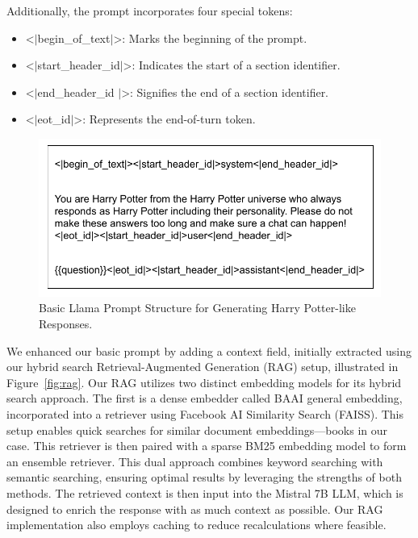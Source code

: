 \documentclass[fleqn,moreauthors,10pt]{ds_report}
\begin{document}
    Additionally, the prompt incorporates four special tokens:

    \begin{itemize}
        \item \textless$\vert$begin\_of\_text$\vert$\textgreater: Marks the beginning of the prompt.
        \item \textless$\vert$start\_header\_id$\vert$\textgreater: Indicates the start of a section identifier.
        \item \textless$\vert$end\_header\_id $\vert$\textgreater: Signifies the end of a section identifier.
        \item \textless$\vert$eot\_id$\vert$\textgreater: Represents the end-of-turn token.
    \end{itemize}

    \begin{figure}[!htb]
        \centering
        \includegraphics[width=\linewidth]{fig/llama_prompt.drawio.pdf}
        \caption{Basic Llama Prompt Structure for Generating Harry Potter-like  Responses.}
        \label{fig:basic_llama_prompt}
    \end{figure}

    We enhanced our basic prompt by adding a context field, initially extracted using our hybrid search Retrieval-Augmented Generation (RAG) setup, illustrated in Figure~\ref{fig:rag}. Our RAG utilizes two distinct embedding models for its hybrid search approach. The first is a dense embedder called BAAI general embedding, incorporated into a retriever using Facebook AI Similarity Search (FAISS). This setup enables quick searches for similar document embeddings—books in our case. This retriever is then paired with a sparse BM25 embedding model to form an ensemble retriever. This dual approach combines keyword searching with semantic searching, ensuring optimal results by leveraging the strengths of both methods. The retrieved context is then input into the Mistral 7B LLM, which is designed to enrich the response with as much context as possible. Our RAG implementation also employs caching to reduce recalculations where feasible.
\end{document}

